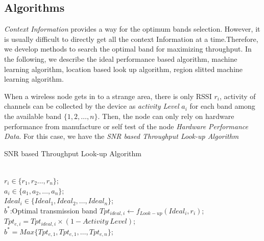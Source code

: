 
	  \subsection{Algorithms}
	  \label{subsec:algorithms}

	  \emph{Context Information} provides a way for the optimum bands selection. However, it is usually difficult to directly get all the context Information at a time.Therefore, we develop methods to search the optimal band for maximizing throughput. In the following, we describe the ideal performance based algorithm, machine learning algorithm, location based look up algorithm, region slitted machine learning algorithm.

	  When a wireless node gets in to a strange area, there is only RSSI $r_i$, activity of channels can be collected by the device as \emph{activity Level} $a_i$ for each band among the available band $\{1,2,\dots,n\}$. Then, the node can only rely on hardware performance from manufacture or self test of the node \emph{Hardware Performance Data}. For this case, we have the \emph{SNR based Throughput Look-up Algorithm}


	  \begin{algorithm}
	  \caption{SNR based Throughput Look-up Algorithm}
	  \label{algorithms: Ideal}
	  \begin{algorithmic}[1]
	  \REQUIRE  ~~\\
		  $r_i \in \{r_1,r_2 \dots,r_n\}$;\\
		  $a_i \in \{a_1,a_2, \dots, a_n\}$;\\
		  $Ideal_i \in \{Ideal_1,Ideal_2,\dots,Ideal_n\}$;
\ENSURE ~~\\    
		  $b^*$:Optimal transmission band
\STATE $Tpt_{ideal,i} \leftarrow f_{Look-up}(Ideal_i,r_i)$;
\STATE  $Tpt_{e,i}=Tpt_{ideal,i}\times(1-Activity \ Level)$;
\ENDFOR \\  
\STATE $b^*=Max\{Tpt_{e,1},Tpt_{e,1},\dots,Tpt_{e,n}\}$;\\
\end{algorithmic}
\end{algorithm}



